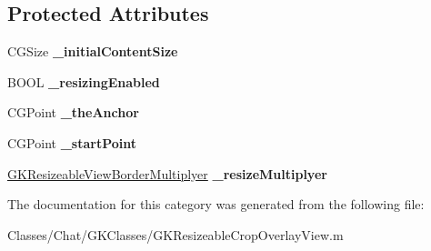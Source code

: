 \subsection*{Protected Attributes}
\begin{DoxyCompactItemize}
\item 
\hypertarget{category_g_k_resizeable_crop_overlay_view_07_08_af3f05f78a6d8f865527234004ed9852e}{}C\+G\+Size {\bfseries \+\_\+initial\+Content\+Size}\label{category_g_k_resizeable_crop_overlay_view_07_08_af3f05f78a6d8f865527234004ed9852e}

\item 
\hypertarget{category_g_k_resizeable_crop_overlay_view_07_08_a4aae1b74b9dd6259750c99d6afbbc582}{}B\+O\+O\+L {\bfseries \+\_\+resizing\+Enabled}\label{category_g_k_resizeable_crop_overlay_view_07_08_a4aae1b74b9dd6259750c99d6afbbc582}

\item 
\hypertarget{category_g_k_resizeable_crop_overlay_view_07_08_a5236347fe89622db7b5b381df99c43cb}{}C\+G\+Point {\bfseries \+\_\+the\+Anchor}\label{category_g_k_resizeable_crop_overlay_view_07_08_a5236347fe89622db7b5b381df99c43cb}

\item 
\hypertarget{category_g_k_resizeable_crop_overlay_view_07_08_a837dab92054ff0c3a0bd6943105b60f2}{}C\+G\+Point {\bfseries \+\_\+start\+Point}\label{category_g_k_resizeable_crop_overlay_view_07_08_a837dab92054ff0c3a0bd6943105b60f2}

\item 
\hypertarget{category_g_k_resizeable_crop_overlay_view_07_08_ae758866ebffba34267ab9700611abd7b}{}\hyperlink{struct_g_k_resizeable_view_border_multiplyer}{G\+K\+Resizeable\+View\+Border\+Multiplyer} {\bfseries \+\_\+resize\+Multiplyer}\label{category_g_k_resizeable_crop_overlay_view_07_08_ae758866ebffba34267ab9700611abd7b}

\end{DoxyCompactItemize}


The documentation for this category was generated from the following file\+:\begin{DoxyCompactItemize}
\item 
Classes/\+Chat/\+G\+K\+Classes/G\+K\+Resizeable\+Crop\+Overlay\+View.\+m\end{DoxyCompactItemize}
